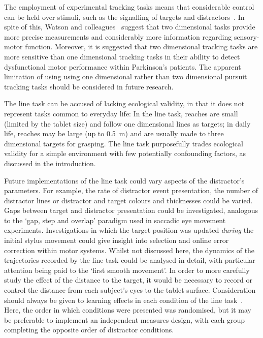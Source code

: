 \documentclass[10pt,letterpaper]{article}
\begin{document}
The employment of experimental tracking tasks means that considerable
control can be held over stimuli, such as the signalling of targets
and distractors~\cite{watson_two-dimensional_1997}. In spite of this,
Watson and colleagues~\cite{watson_two-dimensional_1997} suggest that
two dimensional tasks provide more precise measurements and
considerably more information regarding sensory-motor function.
Moreover, it is suggested that two dimensional tracking tasks are more
sensitive than one dimensional tracking tasks in their ability to
detect dysfunctional motor performance within Parkinson's
patients. The apparent limitation of using using one dimensional
rather than two dimensional pursuit tracking tasks should be
considered in future research.

The line task can be accused of lacking ecological validity, in
that it does not represent tasks common to everyday life: In the line
task, reaches are small (limited by the tablet size) and follow one
dimensional lines as targets; in daily life, reaches may be large (up
to 0.5~m) and are usually made to three dimensional targets for
grasping. The line task purposefully trades ecological validity for a
simple environment with few potentially confounding factors, as
discussed in the introduction.

Future implementations of the line task could vary aspects of the
distractor's parameters. For example, the rate of distractor event
presentation, the number of distractor lines or distractor and target
colours and thicknesses could be varied. Gaps between target and
distractor presentation could be investigated, analogous to the `gap,
step and overlap' paradigm used in saccadic eye movement
experiments. Investigations in which the target position was updated
\emph{during} the initial stylus movement could give insight into
selection and online error correction within motor systems. Whilst not
discussed here, the dynamics of the trajectories recorded by the line
task could be analysed in detail, with particular attention being paid
to the `first smooth movement'. In order to more carefully study the
effect of the distance to the target, it would be necessary to record
or control the distance from each subject's eyes to the tablet
surface. Consideration should always be given to learning effects in
each condition of the line task~\cite{song_automatic_2007}. Here, the
order in which conditions were presented was randomised, but it may be
preferable to implement an independent measures design, with each
group completing the opposite order of distractor conditions.
\end{document}
